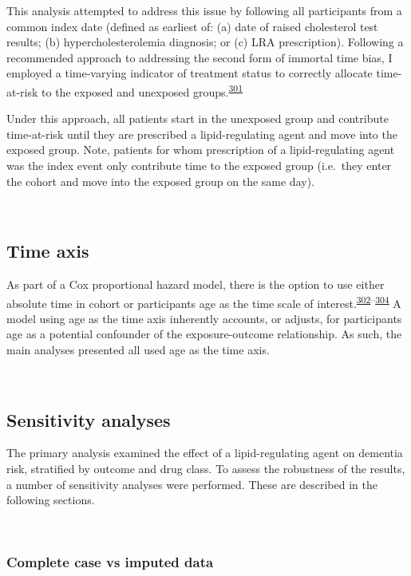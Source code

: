 \documentclass[a4paper, twoside]{templates/ociamthesis}
\begin{document}
This analysis attempted to address this issue by following all participants from a common index date (defined as earliest of: (a) date of raised cholesterol test results; (b) hypercholesterolemia diagnosis; or (c) LRA prescription). Following a recommended approach to addressing the second form of immortal time bias, I employed a time-varying indicator of treatment status to correctly allocate time-at-risk to the exposed and unexposed groups.\textsuperscript{\protect\hyperlink{ref-levesque2010}{301}}

Under this approach, all patients start in the unexposed group and contribute time-at-risk until they are prescribed a lipid-regulating agent and move into the exposed group. Note, patients for whom prescription of a lipid-regulating agent was the index event only contribute time to the exposed group (i.e.~they enter the cohort and move into the exposed group on the same day).

~

\hypertarget{cprd-time-axis}{%
\subsection{Time axis}\label{cprd-time-axis}}

As part of a Cox proportional hazard model, there is the option to use either absolute time in cohort or participants age as the time scale of interest.\textsuperscript{\protect\hyperlink{ref-lamarca1998}{302}--\protect\hyperlink{ref-pencina2007}{304}} A model using age as the time axis inherently accounts, or adjusts, for participants age as a potential confounder of the exposure-outcome relationship. As such, the main analyses presented all used age as the time axis.

~

\hypertarget{sensitivity-analyses}{%
\subsection{Sensitivity analyses}\label{sensitivity-analyses}}

The primary analysis examined the effect of a lipid-regulating agent on dementia risk, stratified by outcome and drug class. To assess the robustness of the results, a number of sensitivity analyses were performed. These are described in the following sections.

~

\hypertarget{complete-case-vs-imputed-data}{%
\subsubsection{Complete case vs imputed data}\label{complete-case-vs-imputed-data}}
\end{document}
